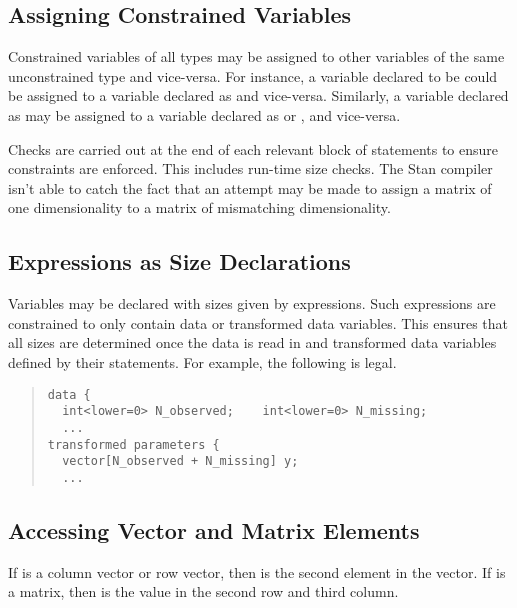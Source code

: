 \subsection{Assigning Constrained Variables}

Constrained variables of all types may be assigned to other variables
of the same unconstrained type and vice-versa.  For instance, a
variable declared to be  could be assigned
to a variable declared as  and vice-versa.  Similarly, a
variable declared as  may be assigned to a variable
declared as  or
, and vice-versa.

Checks are carried out at the end of each relevant block of statements
to ensure constraints are enforced.  This includes run-time size
checks.  The Stan compiler isn't able to catch the fact that an
attempt may be made to assign a matrix of one dimensionality to a
matrix of mismatching dimensionality.  


\subsection{Expressions as Size Declarations}

Variables may be declared with sizes given by expressions.  Such
expressions are constrained to only contain data or transformed data
variables.  This ensures that all sizes are determined once the data
is read in and transformed data variables defined by their statements.
For example, the following is legal.
%
\begin{quote}
\begin{Verbatim}
data {
  int<lower=0> N_observed;    int<lower=0> N_missing;
  ...
transformed parameters {
  vector[N_observed + N_missing] y;
  ...
\end{Verbatim}
\end{quote}

\subsection{Accessing Vector and Matrix Elements}

If  is a column vector or row vector, then  is the
second element in the vector.  If  is a matrix, then
 is the value in the second row and third column.

